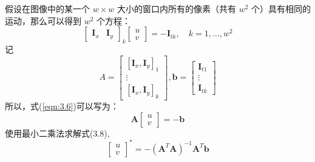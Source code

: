 假设在图像中的某一个 $w \times w $ 大小的窗口内所有的像素（共有 $w^2 $ 个）具有相同的运动，那么可以得到 $w^2 $ 个方程：
\begin{equation}
\label{eqn:3.6}
\left[ \begin{array}{cc}{\boldsymbol{I}_{x}} & {\boldsymbol{I}_{y}}\end{array}\right]_{k} \left[ \begin{array}{c}{u} \\ {v}\end{array}\right]=-\boldsymbol{I}_{t k}, \quad k=1, \ldots, w^{2}
\end{equation}
记
\begin{equation}
\label{eqn:3.7}
A=\left[ \begin{array}{c}{\left[\boldsymbol{I}_{x}, \boldsymbol{I}_{y}\right]_{1}} \\ {\vdots} \\ {\left[\boldsymbol{I}_{x}, \boldsymbol{I}_{y}\right]_{k}}\end{array}\right], \boldsymbol{b}=\left[ \begin{array}{c}{\boldsymbol{I}_{t 1}} \\ {\vdots} \\ {\boldsymbol{I}_{t k}}\end{array}\right]
\end{equation}
所以，式(\ref{eqn:3.6})可以写为：
\begin{equation}
\label{eqn:3.8}
\boldsymbol{A} \left[ \begin{array}{l}{u} \\ {v}\end{array}\right]=-\boldsymbol{b}
\end{equation}
使用最小二乘法求解式(3.8),
\begin{equation}
\label{eqn:3.9}
\left[ \begin{array}{c}{u} \\ {v}\end{array}\right]^{*}=-\left(\boldsymbol{A}^{T} \boldsymbol{A}\right)^{-1} \boldsymbol{A}^{T} \boldsymbol{b}
\end{equation}

